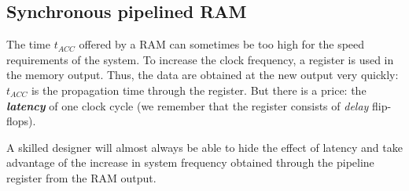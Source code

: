 \subsection{Synchronous pipelined RAM}\label{sybcPipeMem}
The time $t_{ACC}$ offered by a RAM can sometimes be too high for the speed requirements of the system. To increase the clock frequency, a register is used in the memory output. Thus, the data are obtained at the new output very quickly: $t_{ACC}$ is the propagation time through the register. But there is a price: the {\bf {\em latency}} of one clock cycle (we remember that the register consists of {\em delay} flip-flops).

A skilled designer will almost always be able to hide the effect of latency and take advantage of the increase in system frequency obtained through the pipeline register from the RAM output.


